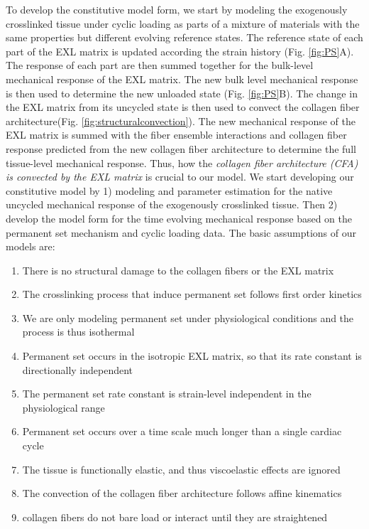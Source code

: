	To develop the constitutive model form, we start by modeling the exogenously crosslinked tissue under cyclic loading as parts of a mixture of materials with the same properties but different evolving reference states. The reference state of each part of the EXL matrix is updated according the strain history (Fig. \ref{fig:PS}A). The response of each part are then summed together for the bulk-level mechanical response of the EXL matrix. The new bulk level mechanical response is then used to determine the new unloaded state (Fig. \ref{fig:PS}B). The change in the EXL matrix from its uncycled state is then used to convect the collagen fiber architecture(Fig. \ref{fig:structuralconvection}). The new mechanical response of the EXL matrix is summed with the fiber ensemble interactions and collagen fiber response predicted from the new collagen fiber architecture to determine the full tissue-level mechanical response. Thus, how the \emph{collagen fiber architecture (CFA) is convected by the EXL matrix} is crucial to our model. We start developing our constitutive model by 1) modeling and parameter estimation for the native uncycled mechanical response of the exogenously crosslinked tissue. Then 2) develop the model form for the time evolving mechanical response based on the permanent set mechanism and cyclic loading data. The basic assumptions of our models are:
\begin{enumerate}
\item There is no structural damage to the collagen fibers or the EXL matrix
\item The crosslinking process that induce permanent set follows first order kinetics
\item We are only modeling permanent set under physiological conditions and the process is thus isothermal
\item Permanent set occurs in the isotropic EXL matrix, so that its rate constant is directionally independent
\item The permanent set rate constant is strain-level independent in the physiological range
\item Permanent set occurs over a time scale much longer than a single cardiac cycle
\item The tissue is functionally elastic, and thus viscoelastic effects are ignored
\item The convection of the collagen fiber architecture follows affine kinematics
\item collagen fibers do not bare load or interact until they are straightened
\cite{lee_presence_2015}
\end{enumerate}

